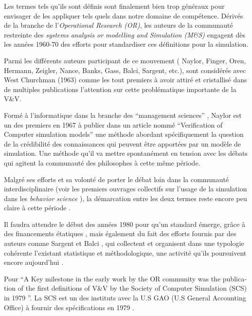 Les termes tels qu'ils sont définis sont finalement bien trop généraux pour envisager de les appliquer tels quels dans notre domaine de compétence. Dérivés de la branche de l'\textit{Operational Research (OR)}, les auteurs de la communauté restreinte des \textit{systems analysis or modelling and Simulation (M\&S) } engagent dès les années 1960-70 des efforts pour standardiser ces définitions pour la simulation.

Parmi les différents auteurs participant de ce mouvement ( Naylor, Finger, Oren, Hermann, Zeigler, Nance, Banks, Gass, Balci, Sargent, etc.), \textcite{Naylor1966} sont considérés avec West Churchman (1963) comme les tout premiers à avoir attiré et cristallisé dans de multiples publications l'attention sur cette problématique importante de la V\&V.

Formé à l'informatique dans la branche des \foreignquote{english}{management sciences} \autocite{Stricklin1985}, Naylor est un des premiers en 1967 \autocite{Naylor1967} à publier dans un article nommé \foreignquote{english}{Verification of Computer simulation models} une méthode abordant spécifiquement la question de la crédibilité des connaissances qui peuvent être apportées par un modèle de simulation. Une méthode qu'il va mettre spontanément en tension avec les débats qui agitent la communauté des philosophes à cette même période.

Malgré ses efforts et sa volonté de porter le débat loin dans la communauté interdisciplinaire (voir les premiers ouvrages collectifs sur l'usage de la simulation dans les \textit{behavior science} \autocites{Dutton1971, Guetzkow1972} ), la démarcation entre les deux termes reste encore peu claire à cette période \autocites[165]{Nance2002}[3]{Balci1986}.

Il faudra attendre le début des années 1980 pour qu'un standard émerge, grâce à des financements étatiques \autocite{Balci1986}, mais également du fait des efforts fournis par des auteurs comme Sargent et Balci \autocite{Nance2002}, qui collectent et organisent dans une typologie cohérente l'existant statistique et méthodologique, une activité qu'ils poursuivent encore aujourd'hui \autocite{Balci1998}.

Pour \textcite[22]{Oberkampf2010} \foreignquote{english}{A Key milestone in the early work by the OR community was the publication of the first definitions of V\&V by the Society of Computer Simulation (SCS) in 1979 \autocite{Schlesinger1979}}. La SCS est un des instituts avec la U.S GAO (U.S General Accounting Office) à fournir des spécifications en 1979 \autocite{Balci1986}.

